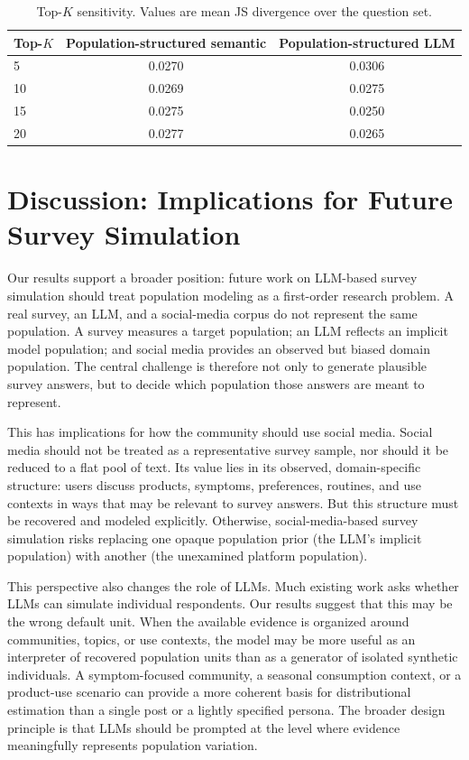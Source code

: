 \documentclass{article}
\begin{document}
\begin{table}[htb!]
\centering
\small
\begin{tabular}{lcc}
\toprule
Top-$K$ & Population-structured semantic & Population-structured LLM \\
\midrule
5  & 0.0270 & 0.0306 \\
10 & 0.0269 & 0.0275 \\
15 & 0.0275 & 0.0250 \\
20 & 0.0277 & 0.0265 \\
\bottomrule
\end{tabular}
\caption{Top-$K$ sensitivity. Values are mean JS divergence over the question set.}
\label{tab:topk}
\end{table}

\section{Discussion: Implications for Future Survey Simulation}
\label{sec:discussion}

Our results support a broader position: future work on LLM-based survey simulation should treat population modeling as a first-order research problem.
A real survey, an LLM, and a social-media corpus do not represent the same population.
A survey measures a target population; an LLM reflects an implicit model population; and social media provides an observed but biased domain population.
The central challenge is therefore not only to generate plausible survey answers, but to decide which population those answers are meant to represent.

This has implications for how the community should use social media.
Social media should not be treated as a representative survey sample, nor should it be reduced to a flat pool of text.
Its value lies in its observed, domain-specific structure: users discuss products, symptoms, preferences, routines, and use contexts in ways that may be relevant to survey answers.
But this structure must be recovered and modeled explicitly.
Otherwise, social-media-based survey simulation risks replacing one opaque population prior (the LLM's implicit population) with another (the unexamined platform population).

This perspective also changes the role of LLMs.
Much existing work asks whether LLMs can simulate individual respondents.
Our results suggest that this may be the wrong default unit.
When the available evidence is organized around communities, topics, or use contexts, the model may be more useful as an interpreter of recovered population units than as a generator of isolated synthetic individuals.
A symptom-focused community, a seasonal consumption context, or a product-use scenario can provide a more coherent basis for distributional estimation than a single post or a lightly specified persona.
The broader design principle is that LLMs should be prompted at the level where evidence meaningfully represents population variation.
\end{document}
